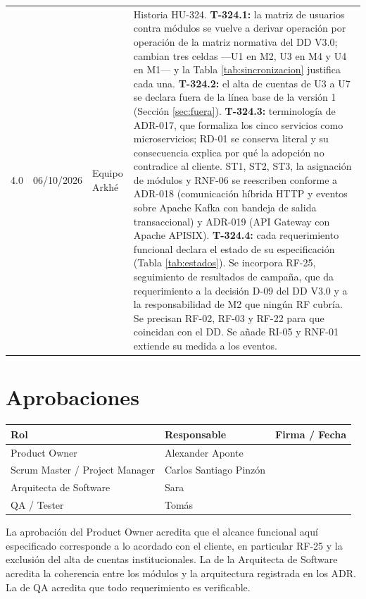 \documentclass[11pt,a4paper]{article}
\begin{document}
\begin{longtable}{L{1.4cm} L{1.8cm} L{2.2cm} L{8.4cm}}
4.0 & 06/10/2026 & Equipo Arkhé & Historia HU-324. \textbf{T-324.1:} la matriz de usuarios contra módulos se vuelve a derivar operación por operación de la matriz normativa del DD V3.0; cambian tres celdas ---U1 en M2, U3 en M4 y U4 en M1--- y la Tabla \ref{tab:sincronizacion} justifica cada una. \textbf{T-324.2:} el alta de cuentas de U3 a U7 se declara fuera de la línea base de la versión 1 (Sección \ref{sec:fuera}). \textbf{T-324.3:} terminología de ADR-017, que formaliza los cinco servicios como microservicios; RD-01 se conserva literal y su consecuencia explica por qué la adopción no contradice al cliente. ST1, ST2, ST3, la asignación de módulos y RNF-06 se reescriben conforme a ADR-018 (comunicación híbrida HTTP y eventos sobre Apache Kafka con bandeja de salida transaccional) y ADR-019 (API Gateway con Apache APISIX). \textbf{T-324.4:} cada requerimiento funcional declara el estado de su especificación (Tabla \ref{tab:estados}). Se incorpora RF-25, seguimiento de resultados de campaña, que da requerimiento a la decisión D-09 del DD V3.0 y a la responsabilidad de M2 que ningún RF cubría. Se precisan RF-02, RF-03 y RF-22 para que coincidan con el DD. Se añade RI-05 y RNF-01 extiende su medida a los eventos. \\
\end{longtable}

\section*{Aprobaciones}

\begin{longtable}{L{4.2cm} L{4.8cm} L{4.6cm}}
\toprule
\textbf{Rol} & \textbf{Responsable} & \textbf{Firma / Fecha} \\
\midrule
\endhead
\bottomrule
\endlastfoot
Product Owner & Alexander Aponte & \\
Scrum Master / Project Manager & Carlos Santiago Pinzón & \\
Arquitecta de Software & Sara & \\
QA / Tester & Tomás & \\
\end{longtable}

\vspace{0.2cm}
{\small La aprobación del Product Owner acredita que el alcance funcional aquí especificado corresponde a lo acordado con el cliente, en particular RF-25 y la exclusión del alta de cuentas institucionales. La de la Arquitecta de Software acredita la coherencia entre los módulos y la arquitectura registrada en los ADR. La de QA acredita que todo requerimiento es verificable.}
\end{document}
